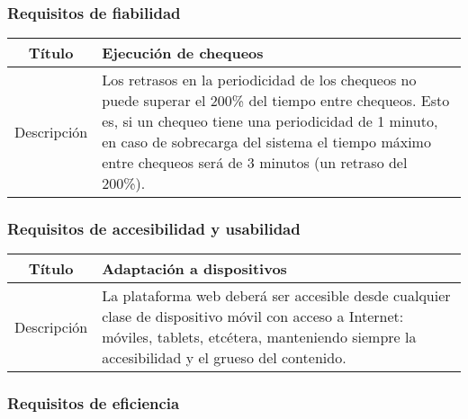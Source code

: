 \FloatBarrier
\subsubsection{Requisitos de fiabilidad}


\begin{center}
  
  \begin{tabularx}{\textwidth}{|c|X|}
    \hline
    Título & Ejecución de chequeos \\

    \hline

    Descripción & Los retrasos en la periodicidad de los chequeos no puede
    superar el 200\% del tiempo entre chequeos. Esto es, si un chequeo tiene una
    periodicidad de 1 minuto, en caso de sobrecarga del sistema el tiempo máximo
    entre chequeos será de 3 minutos (un retraso del 200\%). \\

    \hline
  \end{tabularx}
\end{center}


\FloatBarrier
\subsubsection{Requisitos de accesibilidad y usabilidad}

\begin{center}
  
  \begin{tabularx}{\textwidth}{|c|X|}
    \hline
    Título & Adaptación a dispositivos \\

    \hline

    Descripción & La plataforma web deberá ser accesible desde cualquier clase
    de dispositivo móvil con acceso a Internet: móviles, tablets, etcétera,
    manteniendo siempre la accesibilidad y el grueso del contenido. \\

    \hline
  \end{tabularx}
  \label{tab:accesibilidad}
\end{center}


\FloatBarrier
\subsubsection{Requisitos de eficiencia}

